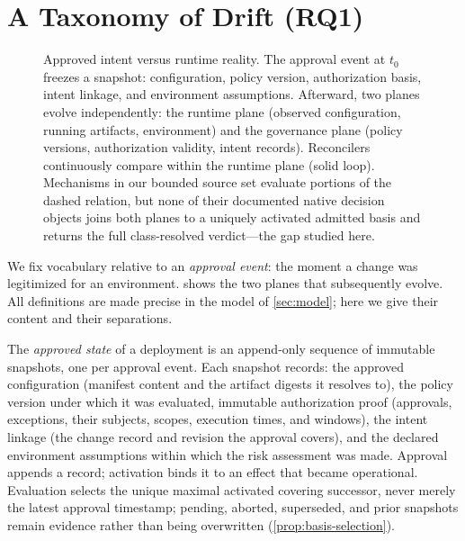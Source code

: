 \section{A Taxonomy of Drift (RQ1)}
\label{sec:taxonomy}

\begin{figure}[t]
\centering
\resizebox{\columnwidth}{!}{}
\caption{Approved intent versus runtime reality. The approval event at $t_0$
freezes a snapshot: configuration, policy version, authorization basis, intent
linkage, and environment assumptions. Afterward, two planes evolve
independently: the runtime plane (observed configuration, running artifacts,
environment) and the governance plane (policy versions, authorization
validity, intent records). Reconcilers continuously compare within the runtime
plane (solid loop). Mechanisms in our bounded source set evaluate portions of
the dashed relation, but none of their documented native decision objects
joins both planes to a uniquely activated admitted basis and returns the full
class-resolved verdict---the gap studied here.}
\label{fig:planes}
\end{figure}

We fix vocabulary relative to an \emph{approval event}: the moment a change
was legitimized for an environment.  shows the two planes
that subsequently evolve. All definitions are made precise in the model of
\cref{sec:model}; here we give their content and their separations.

\begin{definition}
\label{def:approved}
The \emph{approved state} of a deployment is an append-only sequence of
immutable snapshots, one per approval event. Each snapshot records: the
approved configuration (manifest content and the
artifact digests it resolves to), the policy version under which it was
evaluated, immutable authorization proof (approvals, exceptions, their
subjects, scopes, execution times, and windows), the intent linkage (the change record and revision the
approval covers), and the declared environment assumptions within which the
risk assessment was made. Approval appends a record; activation binds it to
an effect that became operational. Evaluation selects the unique maximal
activated covering successor, never merely the latest approval timestamp;
pending, aborted, superseded, and prior snapshots remain evidence rather than
being overwritten (\cref{prop:basis-selection}).
\end{definition}

